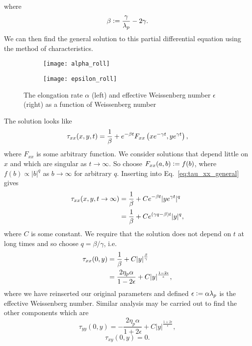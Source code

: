 where
\begin{equation}
\beta \vcentcolon= \frac{\gamma}{\lambda_p} - 2\gamma.
\end{equation}
We can then find the general solution to this partial differential equation using the method of characteristics. \begin{figure}[tbp]
	\centering
\begin{subfigure}{0.5\linewidth}
	\texttt{[image: alpha\_roll]}
	\label{fig:alpha_roll}
\end{subfigure}\hfill
\begin{subfigure}{0.5\linewidth}
	\texttt{[image: epsilon\_roll]}
	\label{fig:epsilon_roll}
\end{subfigure}
\caption{The elongation rate $\alpha$ (left) and effective Weissenberg number $\epsilon$ (right) as a function of Weissenberg number}
\label{fig:four_roll_parameters}
\end{figure}
The solution looks like
\begin{equation}\label{eq:tau_xx_general}
\tau_{xx}(x,y,t) = \frac{1}{\beta} + e^{-\beta t}F_{xx}\left( xe^{-\gamma t}, ye^{\gamma t}\right),
\end{equation}
where $F_{xx}$ is some arbitrary function. We consider solutions that depend little on $x$ and which are singular as $t \rightarrow \infty$. So choose $F_{xx}(a,b) \vcentcolon= f(b)$, where $f(b)\propto \lvert b\rvert^q$ as $b \rightarrow \infty$ for arbitrary $q$. Inserting into Eq.~\eqref{eq:tau_xx_general} gives
\begin{align}
\tau_{xx}(x,y,t \rightarrow \infty) &= \frac{1}{\beta} + Ce^{-\beta t}\lvert ye^{\gamma t} \rvert^q \\
 &= \frac{1}{\beta} + Ce^{\left(\gamma q -\beta\right) t}\lvert y \rvert^q,
\end{align}
where $C$ is some constant. We require that the solution does not depend on $t$ at long times and so choose $q = \beta/\gamma$, i.e. 
\begin{align}
\tau_{xx}(0,y) &= \frac{1}{\beta} + C \lvert y \rvert^\frac{\beta}{\gamma} \\
               &= \frac{2\eta_p\alpha}{1 - 2\epsilon} + C\lvert y\rvert^\frac{1-2\epsilon}{\epsilon},
\end{align}
where we have reinserted our original parameters and defined $\epsilon \vcentcolon= \alpha \lambda_p$ is the effective Weissenberg number. Similar analysis may be carried out to find the other components which are
\begin{equation}
\tau_{yy}(0,y) = -\frac{2\eta_p\alpha}{1 + 2\epsilon} + C\lvert y\rvert^\frac{1+2\epsilon}{\epsilon},
\end{equation}
\begin{equation}
\tau_{xy}(0,y) =0.
\end{equation}


